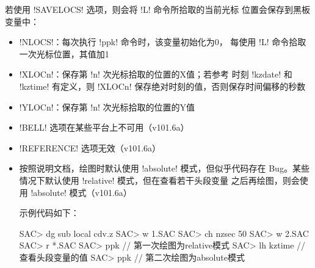 若使用 !SAVELOCS! 选项，则会将 !L! 命令所拾取的当前光标
位置会保存到黑板变量中：
\begin{itemize}
\item !NLOCS!：每次执行 !ppk! 命令时，该变量初始化为0，
    每使用 !L! 命令拾取一次光标位置，其值加1
\item !XLOCn!：保存第 !n! 次光标拾取的位置的X值；若参考
    时刻 !kzdate! 和 !kztime! 有定义，则 !XLOCn!
    保存绝对时刻的值，否则保存时间偏移的秒数
\item !YLOCn!：保存第 !n! 次光标拾取的位置的Y值
\end{itemize}

\begin{itemize}
\item !BELL! 选项在某些平台上不可用（v101.6a）
\item !REFERENCE! 选项无效（v101.6a）
\item 按照说明文档，绘图时默认使用 !absolute! 模式，但似乎代码存在
    Bug。某些情况下默认使用 !relative! 模式，但在查看若干头段变量
    之后再绘图，则会使用 !absolute! 模式（v101.6a）

示例代码如下：
\begin{SACCode}
SAC> dg sub local cdv.z
SAC> w 1.SAC
SAC> ch nzsec 50
SAC> w 2.SAC
SAC> r *.SAC
SAC> ppk            // 第一次绘图为relative模式
SAC> lh kztime      // 查看头段变量的值
SAC> ppk            // 第二次绘图为absolute模式
\end{SACCode}
\end{itemize}
